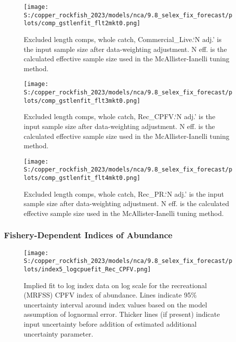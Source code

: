 \documentclass[11pt,
  english,
  letterpaper,
]{article}
\begin{document}
\begin{figure}
\centering
\texttt{[image: S:/copper\_rockfish\_2023/models/nca/9.8\_selex\_fix\_forecast/plots/comp\_gstlenfit\_flt2mkt0.png]}
\caption{Excluded length comps, whole catch, Commercial\_Live.`N adj.' is the input sample size after data-weighting adjustment. N eff. is the calculated effective sample size used in the McAllister-Ianelli tuning method.\label{fig:comp_gstlenfit_flt2mkt0}}
\end{figure}

\begin{figure}
\centering
\texttt{[image: S:/copper\_rockfish\_2023/models/nca/9.8\_selex\_fix\_forecast/plots/comp\_gstlenfit\_flt3mkt0.png]}
\caption{Excluded length comps, whole catch, Rec\_CPFV.`N adj.' is the input sample size after data-weighting adjustment. N eff. is the calculated effective sample size used in the McAllister-Ianelli tuning method.\label{fig:comp_gstlenfit_flt3mkt0}}
\end{figure}

\begin{figure}
\centering
\texttt{[image: S:/copper\_rockfish\_2023/models/nca/9.8\_selex\_fix\_forecast/plots/comp\_gstlenfit\_flt4mkt0.png]}
\caption{Excluded length comps, whole catch, Rec\_PR.`N adj.' is the input sample size after data-weighting adjustment. N eff. is the calculated effective sample size used in the McAllister-Ianelli tuning method.\label{fig:comp_gstlenfit_flt4mkt0}}
\end{figure}

\newpage

\hypertarget{fishery-dependent-indices-of-abundance}{%
\subsubsection{Fishery-Dependent Indices of Abundance}\label{fishery-dependent-indices-of-abundance}}

\begin{figure}
\centering
\texttt{[image: S:/copper\_rockfish\_2023/models/nca/9.8\_selex\_fix\_forecast/plots/index5\_logcpuefit\_Rec\_CPFV.png]}
\caption{Implied fit to log index data on log scale for the recreational (MRFSS) CPFV index of abundance. Lines indicate 95\% uncertainty interval around index values based on the model assumption of lognormal error. Thicker lines (if present) indicate input uncertainty before addition of estimated additional uncertainty parameter.\label{fig:mrfss-cpfv-index-fit}}
\end{figure}
\end{document}
